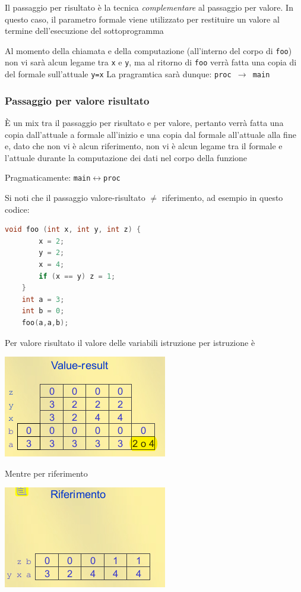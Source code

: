 Il passaggio per risultato è la tecnica \textit{complementare} al passaggio per valore. In questo caso, il parametro formale viene utilizzato per restituire un valore al termine dell'esecuzione del sottoprogramma

Al momento della chiamata e della computazione (all'interno del corpo di \texttt{foo}) non vi sarà alcun legame tra \texttt{x} e \texttt{y}, ma al ritorno di \texttt{foo} verrà fatta una copia di del formale sull'attuale \texttt{y=x}
La pragramtica sarà dunque: \texttt{proc $\to$ main}

\subsubsection{Passaggio per valore risultato}
È un mix tra il passaggio per risultato e per valore, pertanto verrà fatta una copia dall'attuale a formale all'inizio e una copia dal formale all'attuale alla fine e, dato che non vi è alcun riferimento, non vi è alcun legame tra il formale e l'attuale durante la computazione dei dati nel corpo della funzione

Pragmaticamente: \texttt{main$\leftrightarrow$proc}


Si noti che il passaggio valore-risultato $\neq$ riferimento, ad esempio in questo codice:

\begin{lstlisting}[language=C]
    void foo (int x, int y, int z) {
        x = 2;
        y = 2;
        x = 4;
        if (x == y) z = 1;
    }
    int a = 3;
    int b = 0;
    foo(a,a,b);
\end{lstlisting}

Per valore risultato il valore delle variabili istruzione per istruzione è

\begin{center}
    \includegraphics{img/valueresult.png}
\end{center}

Mentre per riferimento
\begin{center}
    \includegraphics{img/riferimento.png}
\end{center}



